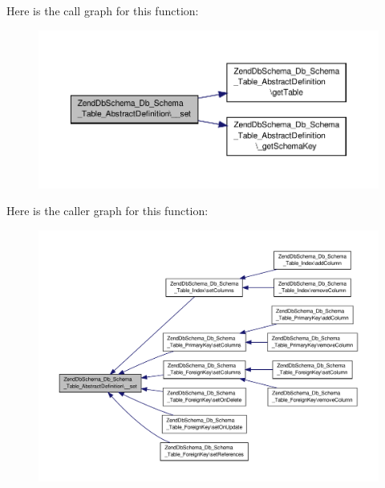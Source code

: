 Here is the call graph for this function\-:\nopagebreak
\begin{figure}[H]
\begin{center}
\leavevmode
\includegraphics[width=350pt]{classZendDbSchema__Db__Schema__Table__AbstractDefinition_a65498451683b2cf8fd1dc65f7f03581d_cgraph}
\end{center}
\end{figure}




Here is the caller graph for this function\-:\nopagebreak
\begin{figure}[H]
\begin{center}
\leavevmode
\includegraphics[width=350pt]{classZendDbSchema__Db__Schema__Table__AbstractDefinition_a65498451683b2cf8fd1dc65f7f03581d_icgraph}
\end{center}
\end{figure}


